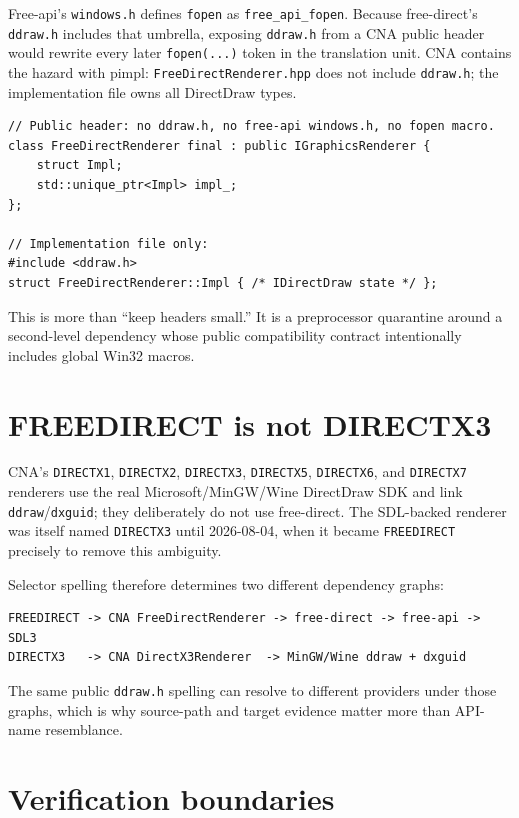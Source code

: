 Free-api's \texttt{windows.h} defines \texttt{fopen} as \texttt{free\_api\_fopen}. Because
free-direct's \texttt{ddraw.h} includes that umbrella, exposing \texttt{ddraw.h} from a CNA
public header would rewrite every later \texttt{fopen(...)} token in the translation unit.
CNA contains the hazard with pimpl: \texttt{FreeDirectRenderer.hpp} does not include
\texttt{ddraw.h}; the implementation file owns all DirectDraw types.

\begin{lstlisting}
// Public header: no ddraw.h, no free-api windows.h, no fopen macro.
class FreeDirectRenderer final : public IGraphicsRenderer {
    struct Impl;
    std::unique_ptr<Impl> impl_;
};

// Implementation file only:
#include <ddraw.h>
struct FreeDirectRenderer::Impl { /* IDirectDraw state */ };
\end{lstlisting}

This is more than ``keep headers small.'' It is a preprocessor quarantine around a second-level
dependency whose public compatibility contract intentionally includes global Win32 macros.

\section{FREEDIRECT is not DIRECTX3}

CNA's \texttt{DIRECTX1}, \texttt{DIRECTX2}, \texttt{DIRECTX3}, \texttt{DIRECTX5},
\texttt{DIRECTX6}, and \texttt{DIRECTX7} renderers use the real Microsoft/MinGW/Wine DirectDraw
SDK and link \texttt{ddraw}/\texttt{dxguid}; they deliberately do not use free-direct. The
SDL-backed renderer was itself named \texttt{DIRECTX3} until 2026-08-04, when it became
\texttt{FREEDIRECT} precisely to remove this ambiguity.

Selector spelling therefore determines two different dependency graphs:

\begin{lstlisting}
FREEDIRECT -> CNA FreeDirectRenderer -> free-direct -> free-api -> SDL3
DIRECTX3   -> CNA DirectX3Renderer  -> MinGW/Wine ddraw + dxguid
\end{lstlisting}

The same public \texttt{ddraw.h} spelling can resolve to different providers under those
graphs, which is why source-path and target evidence matter more than API-name resemblance.

\section{Verification boundaries}

